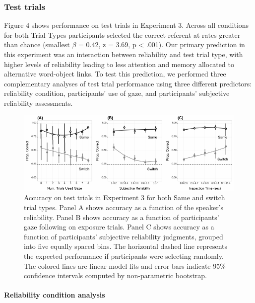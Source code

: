 \documentclass[authoryear, review]{elsarticle}
\newenvironment{CodeChunk}{}{}
\begin{document}
\subsubsection{Test trials}\label{test-trials-2}

Figure 4 shows performance on test trials in Experiment 3. Across all
conditions for both Trial Types participants selected the correct
referent at rates greater than chance (smallest \(\beta\) = 0.42, z =
3.69, p \textless{} .001). Our primary prediction in this experiment was
an interaction between reliability and test trial type, with higher
levels of reliability leading to less attention and memory allocated to
alternative word-object links. To test this prediction, we performed
three complementary analyses of test trial performance using three
different predictors: reliability condition, participants' use of gaze,
and participants' subjective reliability assessments.

\begin{CodeChunk}
\begin{figure}[tb]
\includegraphics{figs/expt3-sub-plots-1} \caption[Accuracy on test trials in Experiment 3 for both Same and switch trial types]{Accuracy on test trials in Experiment 3 for both Same and switch trial types. Panel A shows accuracy as a function of the speaker's reliability. Panel B shows accuracy as a function of participants' gaze following on exposure trials. Panel C shows accuracy as a function of participants' subjective reliability judgments, grouped into five equally spaced bins. The horizontal dashed line represents the expected performance if participants were selecting randomly. The colored lines are linear model fits and error bars indicate 95\% confidence intervals computed by non-parametric bootstrap.}\label{fig:expt3-sub-plots}
\end{figure}
\end{CodeChunk}

\paragraph{Reliability condition
analysis}\label{reliability-condition-analysis}
\end{document}
